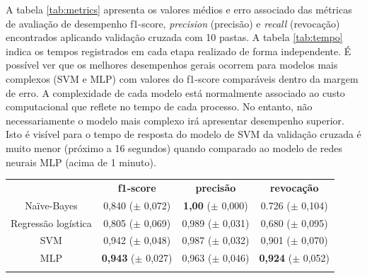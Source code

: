 \documentclass[a4paper,11pt]{article}
\begin{document}
A tabela \ref{tab:metrics} apresenta os valores médios e erro associado das métricas de avaliação 
de desempenho f1-score, \textit{precision} (precisão) e \textit{recall} (revocação) encontrados 
aplicando validação cruzada com 10 pastas. A tabela \ref{tab:tempo} indica os tempos registrados 
em cada etapa realizado de forma independente. É possível ver que os melhores desempenhos gerais 
ocorrem para modelos mais complexos (SVM e MLP) com valores do f1-score comparáveis dentro da 
margem de erro. A complexidade de cada modelo está normalmente associado ao custo computacional 
que reflete no tempo de cada processo. No entanto, não necessariamente o modelo mais complexo irá 
apresentar desempenho superior. Isto é visível para o tempo de resposta do modelo de SVM 
da validação cruzada é muito menor (próximo a 16 segundos) quando comparado ao modelo de redes 
neurais MLP (acima de 1 minuto).


\vspace{.5cm}
\begin{center}
\begin{tabular}{cccc}
 \hline
	        &  \textbf{f1-score}  & \textbf{precisão}  & \textbf{revocação} \\
 Naïve-Bayes	&  0,840 ($\pm$ 0,072) & \textbf{1,00} ($\pm$ 0,000)  & 0.726 ($\pm$ 0,104) \\
 Regressão logística & 0,805 ($\pm$ 0,069) & 0,989 ($\pm$ 0,031) & 0,680 ($\pm$ 0,095) \\
 SVM            &  0,942 ($\pm$ 0,048) & 0,987 ($\pm$ 0,032) & 0,901 ($\pm$ 0,070)  \\
 MLP 		&  \textbf{0,943} ($\pm$ 0,027) & 0,963 ($\pm$ 0,046) & \textbf{0,924} ($\pm$ 0,052)  \\
 \hline
 \label{tab:metrics}
\end{tabular}
\end{center}
\end{document}

